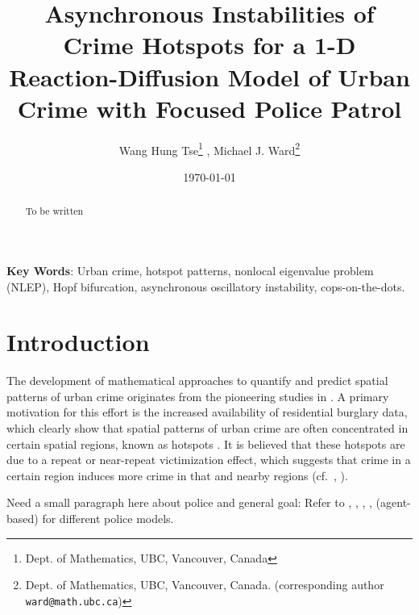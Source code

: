 \documentclass{article}%
\newcommand{\highblue}[1]{{\color{blue}#1}}
\begin{document}
\title{Asynchronous Instabilities of Crime Hotspots for a 1-D
  Reaction-Diffusion Model of Urban Crime with Focused Police Patrol}
\date{\today} \author{Wang Hung Tse\thanks{Dept. of Mathematics, UBC,
    Vancouver, Canada} \enspace, Michael J. Ward\thanks{Dept. of
    Mathematics, UBC, Vancouver, Canada. (corresponding author {\tt
      ward@math.ubc.ca})}}
\baselineskip=16pt

\maketitle

\begin{abstract}
\highblue{To be written}
\end{abstract}

{\bf Key Words}: Urban crime, hotspot patterns, nonlocal eigenvalue
problem (NLEP), Hopf bifurcation, asynchronous oscillatory
instability, cops-on-the-dots.

\setcounter{equation}{0}
\setcounter{section}{0}
\section{Introduction}\label{sec:intro}

The development of mathematical approaches to quantify and predict
spatial patterns of urban crime originates from the pioneering studies
in \cite{s_1, s_2, s_3}. A primary motivation for this effort is the
increased availability of residential burglary data, which clearly
show that spatial patterns of urban crime are often concentrated in
certain spatial regions, known as hotspots \cite{bb}. It is believed
that these hotspots are due to a repeat or near-repeat victimization
effect, which suggests that crime in a certain region induces more
crime in that and nearby regions (cf.~\cite{jb}, \cite{wk}).

\highblue{Need a small paragraph here about police and general goal: Refer to
  \cite{jbc}, \cite{pitcher}, \cite{zipkin}, \cite{rick}, \cite{smith}
  (agent-based) for different police models.}


\end{document}
